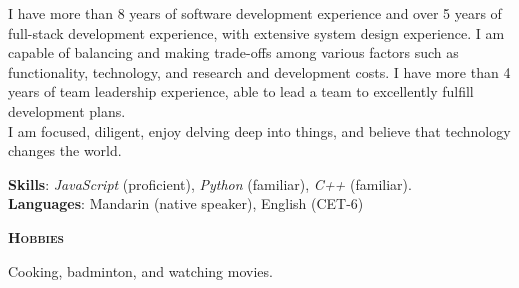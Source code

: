\documentclass[a4paper]{article}
\newenvironment{changemargin}[2]{%
  \begin{list}{}{%
    \setlength{\topsep}{0pt}%
    \setlength{\leftmargin}{#1}%
    \setlength{\rightmargin}{#2}%
    \setlength{\listparindent}{\parindent}%
    \setlength{\itemindent}{\parindent}%
    \setlength{\parsep}{\parskip}%
  }%
  \item[]}{\end{list}
}
\newcommand{\lineover}{
	\begin{changemargin}{-0.05in}{-0.05in}
		\vspace*{-8pt}
		\hrulefill \\
		\vspace*{-2pt}
	\end{changemargin}
}
\newcommand{\header}[1]{
	\begin{changemargin}{-0.5in}{-0.5in}
		\scshape{\large \textbf{#1}}\\
	\end{changemargin}
}
\newenvironment{body} {
	\vspace*{-16pt}
	\begin{changemargin}{-0.5in}{-0.5in}
  }
	{\end{changemargin}
}
\begin{document}
\begin{body}
	\vspace{16pt}
	\begin{justify}
		I have more than 8 years of software development experience and over 5 years of full-stack development experience, with extensive system design experience. I am capable of balancing and making trade-offs among various factors such as functionality, technology, and research and development costs. I have more than 4 years of team leadership experience, able to lead a team to excellently fulfill development plans.\\
		I am focused, diligent, enjoy delving deep into things, and believe that technology changes the world.\\
	\end{justify}
	\vspace{-6pt}
	\textbf{Skills}: \emph{JavaScript} (proficient), \emph{Python} (familiar), \emph{C++} (familiar).\\
	\textbf{Languages}: Mandarin {(native speaker)}, English {(CET-6)}\\
\end{body}

\medskip

\header{Hobbies}

\begin{body}
	\vspace{16pt}
	Cooking, badminton, and watching movies.\\
\end{body}
\end{document}
